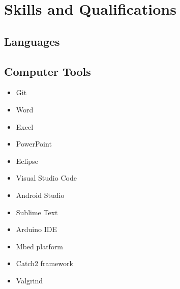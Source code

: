 \documentclass[11pt, a4paper, sans]{moderncv}
\begin{document}
\newpage
\maketitle

\section{Skills and Qualifications}
\subsection{Languages}
\subsection{Computer Tools}
	\begin{multicols}{3}
		\begin{itemize}
			\item  Git
			\item Word
			\item Excel
			\item PowerPoint
			\item Eclipse
			\item Visual Studio Code
			\item Android Studio	
			\item Sublime Text
			\item Arduino IDE
			\item Mbed platform
			\item Catch2 framework 
			\item Valgrind
		\end{itemize}
	\end{multicols}
\end{document}
